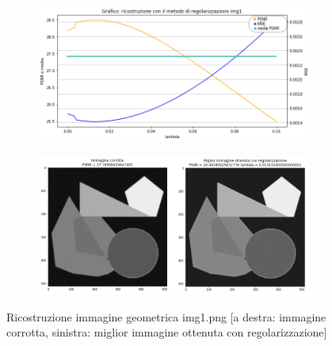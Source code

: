 \begin{figure}[H]
    \centering
    \begin{subfigure}{0.5\textwidth}
        \includegraphics[width=\textwidth]{imgRicostruzione/grafico1minimize.png}
    \end{subfigure}%
    \begin{subfigure}{0.5\textwidth}
        \centering
        \includegraphics[width=\textwidth]{imgRicostruzione/ricostruzione1minimize.png}
    \end{subfigure}
    \caption{Ricostruzione immagine geometrica img1.png [a destra: immagine corrotta, sinistra: miglior immagine ottenuta con regolarizzazione]}
    

\end{figure}
